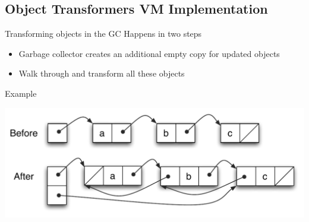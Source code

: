 \subsection{Object Transformers VM Implementation}

\begin{frame}[t]{Transforming objects in the GC}%
Happens in two steps \\
\begin{itemize}
\item Garbage collector creates an additional empty copy for updated objects
\item Walk through and transform all these objects
\end{itemize}
\vspace*{2ex}
Example
\vspace*{-3ex}
\begin{center}
\includegraphics[scale=0.6]{images/singly-doubly/linked-lists-without-gc}%
\end{center}
\end{frame}

